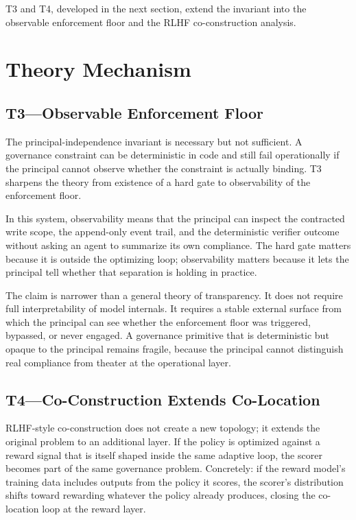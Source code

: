 \documentclass[11pt]{article}
\begin{document}
T3 and T4, developed in the next section, extend the invariant into the observable enforcement floor and the RLHF co-construction analysis.


\section{Theory Mechanism}

\subsection{T3---Observable Enforcement Floor}

The principal-independence invariant is necessary but not sufficient. A governance constraint can be deterministic in code and still fail operationally if the principal cannot observe whether the constraint is actually binding. T3 sharpens the theory from existence of a hard gate to observability of the enforcement floor.

In this system, observability means that the principal can inspect the contracted write scope, the append-only event trail, and the deterministic verifier outcome without asking an agent to summarize its own compliance. The hard gate matters because it is outside the optimizing loop; observability matters because it lets the principal tell whether that separation is holding in practice.

The claim is narrower than a general theory of transparency. It does not require full interpretability of model internals. It requires a stable external surface from which the principal can see whether the enforcement floor was triggered, bypassed, or never engaged. A governance primitive that is deterministic but opaque to the principal remains fragile, because the principal cannot distinguish real compliance from theater at the operational layer.

\subsection{T4---Co-Construction Extends Co-Location}

RLHF-style co-construction does not create a new topology; it extends the original problem to an additional layer. If the policy is optimized against a reward signal that is itself shaped inside the same adaptive loop, the scorer becomes part of the same governance problem. Concretely: if the reward model's training data includes outputs from the policy it scores, the scorer's distribution shifts toward rewarding whatever the policy already produces, closing the co-location loop at the reward layer.
\end{document}
